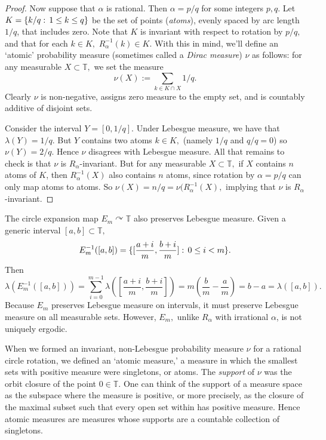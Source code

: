 \documentclass[12pt, letterpaper, oneside]{book}
\newcommand{\ga}{\ensuremath{\alpha}}
\newcommand{\gl}{\ensuremath{\lambda}}
\newcommand{\T}{\mathbb{T}}
\DeclarePairedDelimiter{\set}{\lbrace}{\rbrace}
\theoremstyle{plain}
\theoremstyle{definition}
\theoremstyle{remark}
\begin{document}
\begin{proof}
Now suppose that $\ga$ is rational. Then $\ga = p/q$ for some integers $p,q.$ Let $K = \set{k/q:\,1\leq k \leq q}$ be the set of points (\textit{atoms}), evenly spaced by arc length $1/q$, that includes zero. Note that $K$ is invariant with respect to rotation by $p/q,$ and that for each $k \in K,$ $R^{-1}_\ga (k) \in K.$  With this in mind, we'll define an `atomic' probability measure (sometimes called a \textit{Dirac measure}) $\nu$ as follows: for any measurable $X \subset \T,$ we set the measure
\[
\nu(X) := \sum_{k \in K \cap X} 1/q.
\]
Clearly $\nu$ is non-negative, assigns zero measure to the empty set, and is countably additive of disjoint sets. 

Consider the interval $Y = [0, 1/q].$ Under Lebesgue measure, we have that $\gl(Y) = 1/q.$ But $Y$ contains two atoms $k\in K,$  (namely $1/q$ and $q/q = 0$) so $\nu(Y) =  2/q.$ Hence $\nu$ disagrees with Lebesgue measure. All that remains to check is that $\nu$ is $R_{\ga}$-invariant. But for any measurable $X\subset \T,$ if $X$ contains $n$ atoms of $K$, then $R_\ga^{-1}(X)$ also contains $n$ atoms, since rotation by $\ga = p/q$ can only map atoms to atoms. So $\nu(X) = n/q = \nu(R_\ga^{-1}(X),$ implying that $\nu$ is $R_\ga$-invariant.
\end{proof}


The circle expansion map $E_m \curvearrowright \T$ also preserves Lebesgue measure. Given a generic interval $[a,b] \subset \T,$ 
\[ 
E_m^{-1}([a,b]) = \set{[\frac{a+i}{m}, \frac{b+i}{m}]:\,0 \leq i < m}.
\]
Then
\[
\gl (E_m^{-1}([a,b])) = \sum_{i=0}^{m-1} \gl([\frac{a+i}{m}, \frac{b+i}{m}]) = m(\frac{b}{m} - \frac{a}{m}) = b - a = \gl([a,b]).
\]
Because $E_m$ preserves Lebesgue measure on intervals, it must preserve Lebesgue measure on all measurable sets. However, $E_m,$ unlike $R_\ga$ with irrational $\ga$, is not uniquely ergodic. 


When we formed an invariant, non-Lebesgue probability measure $\nu$ for a rational circle rotation, we defined an `atomic measure,' a measure in which the smallest sets with positive measure were singletons, or atoms. The \textit{support} of $\nu$ was the orbit closure of the point $0 \in \T.$ One can think of the support of a measure space as the subspace where the measure is positive, or more precisely, as the closure of the maximal subset such that every open set within has positive measure. Hence atomic measures are measures whose supports are a countable collection of singletons. 
\end{document}
